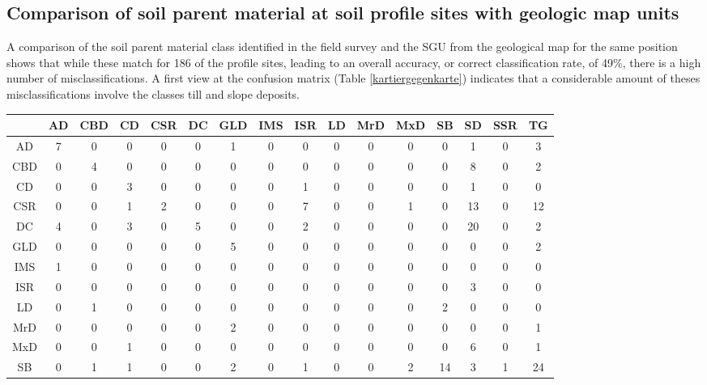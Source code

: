 \documentclass[preprint,12pt,authoryear]{elsarticle}
\begin{document}
\subsection{Comparison of soil parent material at soil profile sites with geologic map units}
A comparison of the soil parent material class identified in the field survey and the SGU from the geological map for the same position shows that while these match for 186 of the profile sites, leading to an overall accuracy, or correct classification rate, of 49\%, there is a high number of misclassifications. A first view at the confusion matrix (Table \ref{kartiergegenkarte}) indicates that a considerable amount of theses misclassifications involve the classes till  and slope deposits. 
\begin{table}[ht]
\centering
\tabcolsep=0.06cm
\begin{tabular}{c|ccccccccccccccc}
 & AD & CBD & CD & CSR & DC & GLD & IMS & ISR & LD & MrD & MxD & SB & SD & SSR & TG \\ 
  \hline
AD &   7 &   0 &   0 &   0 &   0 &   1 &   0 &   0 &   0 &   0 &   0 &   0 &   1 &   0 &   3 \\ 
  CBD &   0 &   4 &   0 &   0 &   0 &   0 &   0 &   0 &   0 &   0 &   0 &   0 &   8 &   0 &   2 \\ 
  CD &   0 &   0 &   3 &   0 &   0 &   0 &   0 &   1 &   0 &   0 &   0 &   0 &   1 &   0 &   0 \\ 
  CSR &   0 &   0 &   1 &   2 &   0 &   0 &   0 &   7 &   0 &   0 &   1 &   0 &  13 &   0 &  12 \\ 
  DC &   4 &   0 &   3 &   0 &   5 &   0 &   0 &   2 &   0 &   0 &   0 &   0 &  20 &   0 &   2 \\ 
  GLD &   0 &   0 &   0 &   0 &   0 &   5 &   0 &   0 &   0 &   0 &   0 &   0 &   0 &   0 &   2 \\ 
  IMS &   1 &   0 &   0 &   0 &   0 &   0 &   0 &   0 &   0 &   0 &   0 &   0 &   0 &   0 &   0 \\ 
  ISR &   0 &   0 &   0 &   0 &   0 &   0 &   0 &   0 &   0 &   0 &   0 &   0 &   3 &   0 &   0 \\ 
  LD &   0 &   1 &   0 &   0 &   0 &   0 &   0 &   0 &   0 &   0 &   0 &   2 &   0 &   0 &   0 \\ 
  MrD &   0 &   0 &   0 &   0 &   0 &   2 &   0 &   0 &   0 &   0 &   0 &   0 &   0 &   0 &   1 \\ 
  MxD &   0 &   0 &   1 &   0 &   0 &   0 &   0 &   0 &   0 &   0 &   0 &   0 &   6 &   0 &   1 \\ 
  SB &   0 &   1 &   1 &   0 &   0 &   2 &   0 &   1 &   0 &   0 &   2 &  14 &   3 &   1 &  24 \\ 

\end{tabular}
\end{table}
\end{document}
